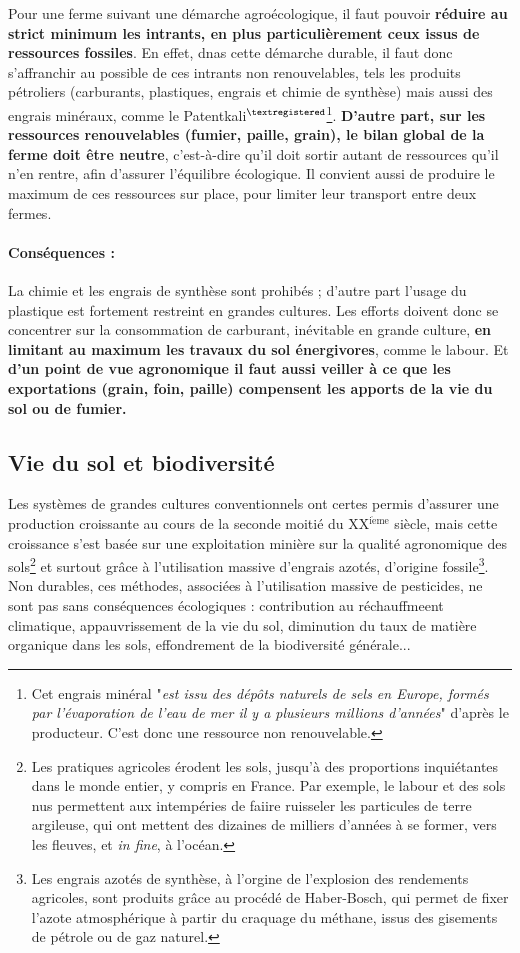 \documentclass{book}
\begin{document}
Pour une ferme suivant une démarche agroécologique, il faut pouvoir \textbf{réduire au strict minimum les intrants, en plus particulièrement ceux issus de ressources fossiles}. En effet, dnas cette démarche durable, il faut donc s'affranchir au possible de ces intrants non renouvelables, tels les produits pétroliers (carburants, plastiques, engrais et chimie de synthèse) mais aussi des engrais minéraux, comme le Patentkali$^\mathrm{\textregistered}$\footnote{Cet engrais minéral "\textit{est issu des dépôts naturels de sels en Europe, formés par l’évaporation de l’eau de mer il y a plusieurs millions d’années}" d'après le producteur. C'est donc une ressource non renouvelable.}. \textbf{D'autre part, sur les ressources renouvelables (fumier, paille, grain), le bilan global de la ferme doit être neutre}, c'est-à-dire qu'il doit sortir autant de ressources qu'il n'en rentre, afin d'assurer l'équilibre écologique. Il convient aussi de produire le maximum de ces ressources sur place, pour limiter leur transport entre deux fermes.

\paragraph{Conséquences :} La chimie et les engrais de synthèse sont prohibés ; d'autre part l'usage du plastique est fortement restreint en grandes cultures. Les efforts doivent donc se concentrer sur la consommation de carburant, inévitable en grande culture, \textbf{en limitant au maximum les travaux du sol énergivores}, comme le labour. Et \textbf{d'un point de vue agronomique il faut aussi veiller à ce que les exportations (grain, foin, paille) compensent les apports de la vie du sol ou de fumier.}

\subsection{Vie du sol et biodiversité}

Les systèmes de grandes cultures conventionnels ont certes permis d'assurer une production croissante au cours de la seconde moitié du XX$^{\mathrm{i\grave{e}me}}$ siècle, mais cette croissance s'est basée sur une exploitation minière sur la qualité agronomique des sols\footnote{Les pratiques agricoles érodent les sols, jusqu'à des proportions inquiétantes dans le monde entier, y compris en France. Par exemple, le labour et des sols nus permettent aux intempéries de faiire ruisseler les particules de terre argileuse, qui ont mettent des dizaines de milliers d'années à se former, vers les fleuves, et \textit{in fine}, à l'océan.} et surtout grâce à l'utilisation massive d'engrais azotés, d'origine fossile\footnote{Les engrais azotés de synthèse, à l'orgine de l'explosion des rendements agricoles, sont produits grâce au procédé de Haber-Bosch, qui permet de fixer l'azote atmosphérique à partir du craquage du méthane, issus des gisements de pétrole ou de gaz naturel.}. Non durables, ces méthodes, associées à l'utilisation massive de pesticides, ne sont pas sans conséquences écologiques : contribution au réchauffmeent climatique, appauvrissement de la vie du sol, diminution du taux de matière organique dans les sols, effondrement de la biodiversité générale...
\end{document}
